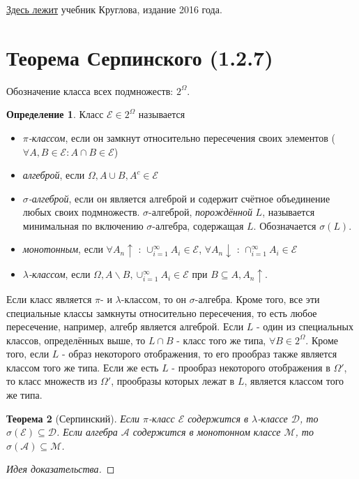 \documentclass[16pt]{article}
\newtheorem{theorem}{Теорема}[section]
\theoremstyle{definition}
\newtheorem{definition}[theorem]{Определение}
\begin{document}
\href{https://yadi.sk/d/d-ti\_TZi3Mh3Ri/7\%20sem/\%D0\%94\%D0\%93\%D0\%A1\%D0\%9F}{Здесь лежит} учебник Круглова, издание 2016 года.

\newpage

\section{Теорема Серпинского (1.2.7)}
Обозначение класса всех подмножеств: $2^\Omega$.
\begin{definition}
Класс $\mathcal{E} \in 2^\Omega$ называется 
\begin{itemize}
    \item \textit{$\pi$-классом}, если он замкнут относительно пересечения своих элементов ($\forall A, B \in \mathcal{E} : A \cap B \in \mathcal{E}$)
    \item \textit{алгеброй}, если $\Omega, A \cup B, A^c \in \mathcal{E}$
    \item \textit{$\sigma$-алгеброй}, если он является алгеброй и содержит счётное объединение любых своих подмножеств. $\sigma$-алгеброй, \textit{порождённой} $L$, называется минимальная по включению $\sigma$-алгебра, содержащая $L$. Обозначается $\sigma(L)$. 
    \item \textit{монотонным}, если $\forall A_n \uparrow$ : $\cup_{i=1}^\infty A_i \in \mathcal{E}$, $\forall A_n \downarrow$ : $\cap_{i=1}^\infty A_i \in \mathcal{E}$
    \item \textit{$\lambda$-классом}, если $\Omega, A \backslash B, \cup_{i=1}^\infty A_i \in \mathcal{E}$ при $B \subseteq A, A_n \uparrow$.
\end{itemize}
\end{definition}
Если класс является $\pi$- и $\lambda$-классом, то он $\sigma$-алгебра. Кроме того, все эти специальные классы замкнуты относительно пересечения, то есть любое пересечение, например, алгебр является алгеброй. \newline
Если $L$ - один из специальных классов, определённых выше, то $L \cap B$ - класс того же типа, $\forall B \in 2^\Omega$. Кроме того, если $L$ - образ некоторого отображения, то его прообраз также является классом того же типа. Если же есть $L$ - прообраз некоторого отображения в $\Omega'$, то класс множеств из $\Omega'$, прообразы которых лежат в $L$, является классом того же типа.
\begin{theorem}[Серпинский]
Если $\pi$-класс $\mathcal{E}$ содержится в $\lambda$-классе $\mathcal{D}$, то $\sigma(\mathcal{E}) \subseteq \mathcal{D}$. Если алгебра $\mathcal{A}$ содержится в монотонном классе $\mathcal{M}$, то $\sigma(\mathcal{A}) \subseteq \mathcal{M}$. 
\end{theorem}
\begin{proof}[Идея доказательства]

\end{proof}
\end{document}
